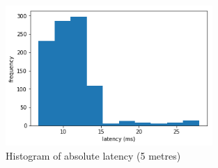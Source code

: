 
\begin{figure}[htbp]
  \centering
    \includegraphics[width=0.7\textwidth]{Chapters/Figures/technical/Latency/figure5.png}
    \caption{Histogram of absolute latency (5 metres)}
    \label{fig:latency_fig5}
\end{figure}

